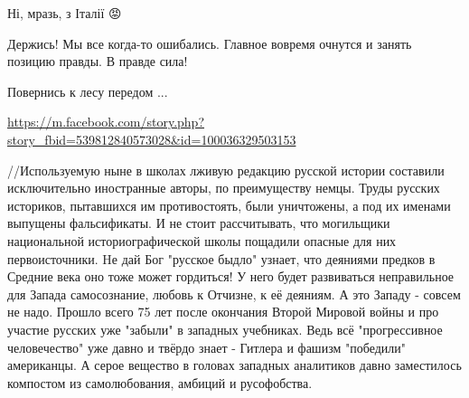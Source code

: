 \begin{itemize}
\begin{itemize}
Ні, мразь, з Італії
😡
\end{itemize}

 
Держись! Мы все когда-то ошибались. Главное вовремя очнутся и занять позицию правды. В правде сила!

\begin{itemize}
 
Повернись к лесу передом ...
\end{itemize}

 
\url{https://m.facebook.com/story.php?story_fbid=539812840573028&id=100036329503153}

 

//Используемую ныне в школах лживую редакцию русской истории составили
исключительно иностранные авторы, по преимуществу немцы. Труды русских
историков, пытавшихся им противостоять, были уничтожены, а под их именами
выпущены фальсификаты. И не стоит рассчитывать, что могильщики национальной
историографической школы пощадили опасные для них первоисточники. Hе дай Бог
"русское быдло" узнает, что деяниями предков в Средние века оно тоже может
гордиться! У него будет развиваться неправильное для Запада самосознание,
любовь к Отчизне, к её деяниям. А это Западу - совсем не надо. Прошло всего 75
лет после окончания Второй Мировой войны и про участие русских уже "забыли" в
западных учебниках. Ведь всё "прогрессивное человечество" уже давно и твёрдо
знает - Гитлера и фашизм "победили" американцы. А серое вещество в головах
западных аналитиков давно заместилось компостом из самолюбования, амбиций и
русофобства.


\end{itemize}

